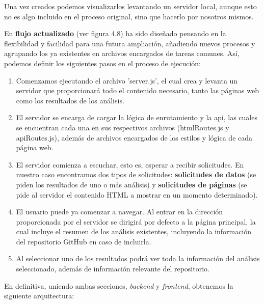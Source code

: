 \documentclass[a4paper, 12pt]{book}
\begin{document}
Una vez creados podemos visualizarlos levantando un servidor local, aunque esto no es algo incluido en el proceso original, sino que hacerlo por nosotros mismos.

En \textbf{flujo actualizado} (ver figura 4.8) ha sido diseñado pensando en la flexibilidad y facilidad para una futura ampliación, añadiendo nuevos procesos y agrupando los ya existentes en archivos encargados de tareas comunes. Así, podemos definir los siguientes pasos en el proceso de ejecución:

\begin{enumerate}
    \item  Comenzamos ejecutando el archivo 'server.js', el cual crea y levanta un servidor que proporcionará todo el contenido necesario, tanto las páginas web como los resultados de los análisis. 
    
    \item El servidor se encarga de cargar la lógica de enrutamiento y la api, las cuales se encuentran cada una en sus respectivos archivos (htmlRoutes.js y apiRoutes.js), además de archivos encargados de los estilos y lógica de cada página web.

    \item El servidor comienza a escuchar, esto es, esperar a recibir solicitudes. En nuestro caso encontramos dos tipos de solicitudes: \textbf{solicitudes de datos} (se piden los resultados de uno o más análisis) y \textbf {solicitudes de páginas} (se pide al servidor el contenido HTML a mostrar en un momento determinado).

    \item El usuario puede ya comenzar a navegar. Al entrar en la dirección proporcionada por el servidor se dirigirá por defecto a la página principal, la cual incluye el resumen de los análisis existentes, incluyendo la información del repositorio GitHub en caso de incluirla.

    \item Al seleccionar uno de los resultados podrá ver toda la información del análisis seleccionado, además de información relevante del repositorio.
    
\end{enumerate}

En definitiva, uniendo ambas secciones, \textit{backend} y \textit{frontend}, obtenemos la siguiente arquitectura:
\end{document}
